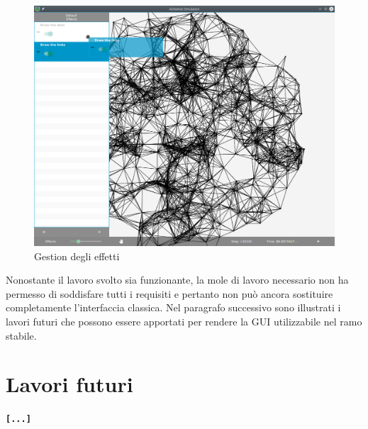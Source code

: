         \begin{figure}[htbp]
            \centering
            \includegraphics[scale=0.45]{img/withNodes/simWithDnD}
            \caption{Gestion  degli effetti}
            \label{fig:simWithDnD}
        \end{figure}

        Nonostante il lavoro svolto sia funzionante, la mole di lavoro necessario non ha permesso di soddisfare tutti i requisiti e pertanto non può ancora sostituire completamente l'interfaccia classica. Nel paragrafo successivo sono illustrati i lavori futuri che possono essere apportati per rendere la GUI utilizzabile nel ramo stabile.

    \section{Lavori futuri}\label{sec:futuro}
        \textbf{\texttt{[...]}}

